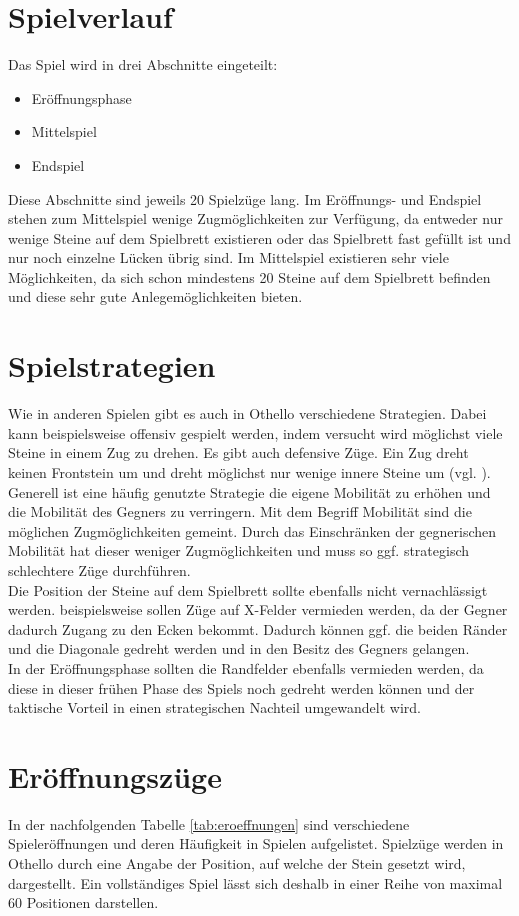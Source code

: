 \section{Spielverlauf}
Das Spiel wird in drei Abschnitte eingeteilt:
\begin{itemize}
\item Eröffnungsphase
\item Mittelspiel
\item Endspiel
\end{itemize}
Diese Abschnitte sind jeweils 20 Spielzüge lang.
Im Eröffnungs- und Endspiel stehen zum Mittelspiel wenige Zugmöglichkeiten zur Verfügung, da entweder nur wenige Steine auf dem Spielbrett existieren oder das Spielbrett fast gefüllt ist und nur noch einzelne Lücken übrig sind. Im Mittelspiel existieren sehr viele Möglichkeiten, da sich schon mindestens 20 Steine auf dem Spielbrett befinden und diese sehr gute Anlegemöglichkeiten bieten. 
\section{Spielstrategien}
Wie in anderen Spielen gibt es auch in Othello verschiedene Strategien. Dabei kann beispielsweise offensiv gespielt werden, indem versucht wird möglichst viele Steine in einem Zug zu drehen. Es gibt auch defensive  Züge. Ein  Zug dreht keinen Frontstein um und dreht möglichst nur wenige innere Steine um (vgl. \cite{Ortiz.}).
\\ Generell ist eine häufig genutzte Strategie die eigene Mobilität zu erhöhen und die Mobilität des Gegners zu verringern. Mit dem Begriff Mobilität sind die möglichen Zugmöglichkeiten gemeint. Durch das Einschränken der gegnerischen Mobilität hat dieser weniger Zugmöglichkeiten und muss so ggf. strategisch schlechtere Züge durchführen.
\\Die Position der Steine auf dem Spielbrett sollte ebenfalls nicht vernachlässigt werden.
beispielsweise sollen Züge auf X-Felder vermieden werden, da der Gegner dadurch Zugang zu den Ecken bekommt. Dadurch können ggf. die beiden Ränder und die Diagonale gedreht werden und in den Besitz des Gegners gelangen.
\\In der Eröffnungsphase sollten die Randfelder ebenfalls vermieden werden, da diese in dieser frühen Phase des Spiels noch gedreht werden können und der taktische Vorteil in einen strategischen Nachteil umgewandelt wird.
\section{Eröffnungszüge}
In der nachfolgenden Tabelle \ref{tab:eroeffnungen} sind verschiedene Spieleröffnungen und deren Häufigkeit in Spielen aufgelistet. Spielzüge werden in Othello durch eine Angabe der Position, auf welche der Stein gesetzt wird, dargestellt. Ein vollständiges Spiel lässt sich deshalb in einer Reihe von maximal 60 Positionen darstellen.

